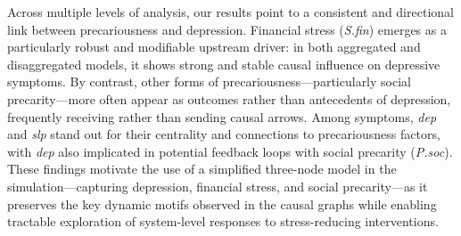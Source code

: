 \documentclass[
]{article}
\begin{document}
Across multiple levels of analysis, our results point to a consistent
and directional link between precariousness and depression. Financial
stress (\emph{S.fin}) emerges as a particularly robust and modifiable
upstream driver: in both aggregated and disaggregated models, it shows
strong and stable causal influence on depressive symptoms. By contrast,
other forms of precariousness---particularly social precarity---more
often appear as outcomes rather than antecedents of depression,
frequently receiving rather than sending causal arrows. Among symptoms,
\emph{dep} and \emph{slp} stand out for their centrality and connections
to precariousness factors, with \emph{dep} also implicated in potential
feedback loops with social precarity (\emph{P.soc}). These findings
motivate the use of a simplified three-node model in the
simulation---capturing depression, financial stress, and social
precarity---as it preserves the key dynamic motifs observed in the
causal graphs while enabling tractable exploration of system-level
responses to stress-reducing interventions.
\end{document}
